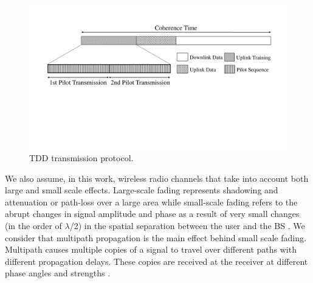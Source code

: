 \documentclass[journal,12pt,onecolumn]{IEEEtran}
\begin{document}
\begin{figure}[t]
\centering
\includegraphics[trim = 0mm 1mm 0mm 0mm, clip=true, scale=0.3]{cropped_TDD_Protocol_Frame_Structure_v2.pdf}
\caption{TDD transmission protocol.}
\label{fig:tdd_protocol}
\vspace{-6mm}
\end{figure}

We also assume, in this work, wireless radio channels that take into account both large and small scale effects. Large-scale fading represents shadowing and attenuation or path-loss over a large area while small-scale fading refers to the abrupt changes in signal amplitude and phase as a result of very small changes (in the order of $\lambda$/2) in the spatial separation between the user and the BS \cite{rappaport:wireless_comm}. We consider that multipath propagation is the main effect behind small scale fading. Multipath causes multiple copies of a signal to travel over different paths with different propagation delays. These copies are received at the receiver at different phase angles and strengths \cite{sklar:rayleigh_channels}.
\end{document}
